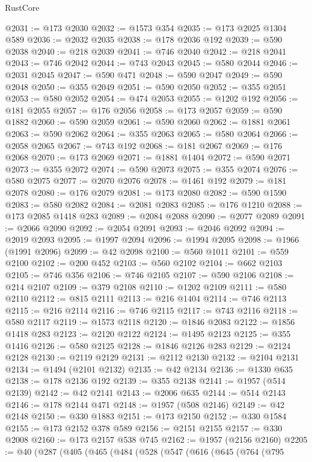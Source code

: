 \begin{lexlean}{RustCore}
\begin{coremodule}
@2031 := @173 @2030
@2032 := @1573 @354
@2035 := @173 @2025 @1304 @589
@2036 := @2032 @2035
@2038 := @178 @2036 @192
@2039 := @590 @2038
@2040 := @218 @2039
@2041 := @746 @2040
@2042 := @218 @2041
@2043 := @746 @2042
@2044 := @743 @2043
@2045 := @580 @2044
@2046 := @2031 @2045
@2047 := @590 @471
@2048 := @590 @2047
@2049 := @590 @2048
@2050 := @355 @2049
@2051 := @590 @2050
@2052 := @355 @2051
@2053 := @580 @2052
@2054 := @474 @2053
@2055 := @1202 @192
@2056 := @181 @2055
@2057 := @176 @2056
@2058 := @173 @2057
@2059 := @590 @1882
@2060 := @590 @2059
@2061 := @590 @2060
@2062 := @1881 @2061
@2063 := @590 @2062
@2064 := @355 @2063
@2065 := @580 @2064
@2066 := @2058 @2065
@2067 := @743 @192
@2068 := @181 @2067
@2069 := @176 @2068
@2070 := @173 @2069
@2071 := @1881 @1404
@2072 := @590 @2071
@2073 := @355 @2072
@2074 := @590 @2073
@2075 := @355 @2074
@2076 := @580 @2075
@2077 := @2070 @2076
@2078 := @1461 @192
@2079 := @181 @2078
@2080 := @176 @2079
@2081 := @173 @2080
@2082 := @590 @1590
@2083 := @580 @2082
@2084 := @2081 @2083
@2085 := @176 @1210
@2088 := @173 @2085 @1418 @283
@2089 := @2084 @2088
@2090 := @2077 @2089
@2091 := @2066 @2090
@2092 := @2054 @2091
@2093 := @2046 @2092
@2094 := @2019 @2093
@2095 := @1997 @2094
@2096 := @1994 @2095
@2098 := @1966 (@1991 @2096)
@2099 := @42 @2098
@2100 := @560 @1011
@2101 := @559 @2100
@2102 := @200 @452
@2103 := @560 @2102
@2104 := @662 @2103
@2105 := @746 @356
@2106 := @746 @2105
@2107 := @590 @2106
@2108 := @214 @2107
@2109 := @379 @2108
@2110 := @1202 @2109
@2111 := @580 @2110
@2112 := @815 @2111
@2113 := @216 @1404
@2114 := @746 @2113
@2115 := @216 @2114
@2116 := @746 @2115
@2117 := @743 @2116
@2118 := @580 @2117
@2119 := @1573 @2118
@2120 := @1846 @2083
@2122 := @1856 @1418 @283
@2123 := @2120 @2122
@2124 := @1495 @2123
@2125 := @355 @1416
@2126 := @580 @2125
@2128 := @1846 @2126 @283
@2129 := @2124 @2128
@2130 := @2119 @2129
@2131 := @2112 @2130
@2132 := @2104 @2131
@2134 := @1494 (@2101 @2132)
@2135 := @42 @2134
@2136 := @1330 @635
@2138 := @178 @2136 @192
@2139 := @355 @2138
@2141 := @1957 (@514 @2139)
@2142 := @42 @2141
@2143 := @2006 @635
@2144 := @514 @2143
@2146 := @178 @2144 @471
@2148 := @1957 (@508 @2146)
@2149 := @42 @2148
@2150 := @330 @1883
@2151 := @173 @2150
@2152 := @330 @1584
@2155 := @173 @2152 @378 @589
@2156 := @2151 @2155
@2157 := @330 @2008
@2160 := @173 @2157 @538 @745
@2162 := @1957 (@2156 @2160)
@2205 := @40
    (@287
      (@405
        (@465
          (@484
            (@528
              (@547
                (@616
                  (@645
                    (@764
                      (@795

\end{coremodule}
\end{lexlean}
